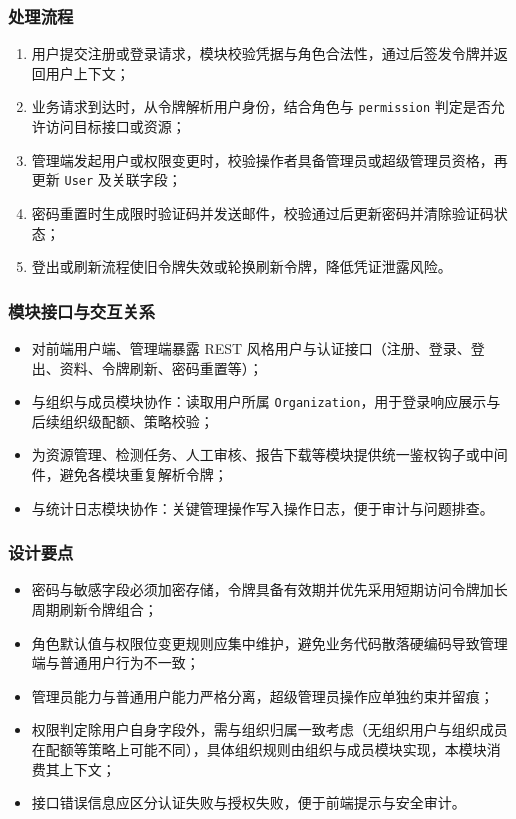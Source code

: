 \subsubsection{处理流程}
\begin{enumerate}[leftmargin=2em]
    \item 用户提交注册或登录请求，模块校验凭据与角色合法性，通过后签发令牌并返回用户上下文；
    \item 业务请求到达时，从令牌解析用户身份，结合角色与 \texttt{permission} 判定是否允许访问目标接口或资源；
    \item 管理端发起用户或权限变更时，校验操作者具备管理员或超级管理员资格，再更新 \texttt{User} 及关联字段；
    \item 密码重置时生成限时验证码并发送邮件，校验通过后更新密码并清除验证码状态；
    \item 登出或刷新流程使旧令牌失效或轮换刷新令牌，降低凭证泄露风险。
\end{enumerate}

\subsubsection{模块接口与交互关系}
\begin{itemize}[leftmargin=2em]
    \item 对前端用户端、管理端暴露 REST 风格用户与认证接口（注册、登录、登出、资料、令牌刷新、密码重置等）；
    \item 与组织与成员模块协作：读取用户所属 \texttt{Organization}，用于登录响应展示与后续组织级配额、策略校验；
    \item 为资源管理、检测任务、人工审核、报告下载等模块提供统一鉴权钩子或中间件，避免各模块重复解析令牌；
    \item 与统计日志模块协作：关键管理操作写入操作日志，便于审计与问题排查。
\end{itemize}

\subsubsection{设计要点}
\begin{itemize}[leftmargin=2em]
    \item 密码与敏感字段必须加密存储，令牌具备有效期并优先采用短期访问令牌加长周期刷新令牌组合；
    \item 角色默认值与权限位变更规则应集中维护，避免业务代码散落硬编码导致管理端与普通用户行为不一致；
    \item 管理员能力与普通用户能力严格分离，超级管理员操作应单独约束并留痕；
    \item 权限判定除用户自身字段外，需与组织归属一致考虑（无组织用户与组织成员在配额等策略上可能不同），具体组织规则由组织与成员模块实现，本模块消费其上下文；
    \item 接口错误信息应区分认证失败与授权失败，便于前端提示与安全审计。
\end{itemize}

